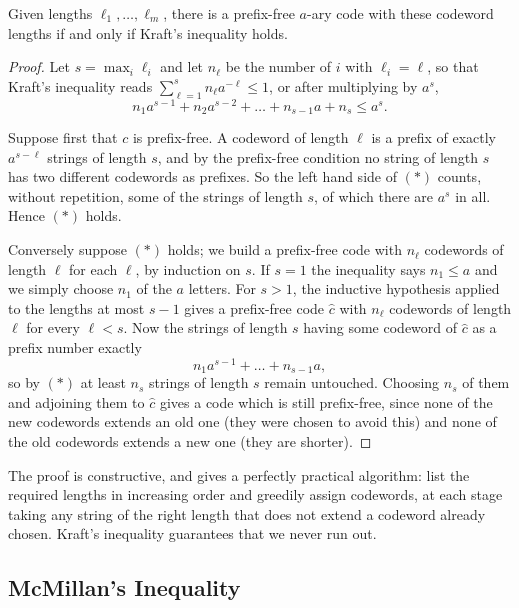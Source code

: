 \begin{theorem}[Kraft]
	Given lengths $\ell_1, \dots, \ell_m$, there is a prefix-free $a$-ary code with these codeword lengths if and only if Kraft's inequality holds.
\end{theorem}

\begin{proof}
	Let $s = \max_i \ell_i$ and let $n_\ell$ be the number of $i$ with $\ell_i = \ell$, so that Kraft's inequality reads $\sum_{\ell=1}^s n_\ell a^{-\ell} \le 1$, or after multiplying by $a^s$,
	\begin{equation*} n_1 a^{s-1} + n_2 a^{s-2} + \dots + n_{s-1}a + n_s \le a^s. \tag{$\ast$}\end{equation*}

	Suppose first that $c$ is prefix-free. A codeword of length $\ell$ is a prefix of exactly $a^{s-\ell}$ strings of length $s$, and by the prefix-free condition no string of length $s$ has two different codewords as prefixes. So the left hand side of $(\ast)$ counts, without repetition, some of the strings of length $s$, of which there are $a^s$ in all. Hence $(\ast)$ holds.

	Conversely suppose $(\ast)$ holds; we build a prefix-free code with $n_\ell$ codewords of length $\ell$ for each $\ell$, by induction on $s$. If $s = 1$ the inequality says $n_1 \le a$ and we simply choose $n_1$ of the $a$ letters. For $s > 1$, the inductive hypothesis applied to the lengths at most $s-1$ gives a prefix-free code $\hat c$ with $n_\ell$ codewords of length $\ell$ for every $\ell < s$. Now the strings of length $s$ having some codeword of $\hat c$ as a prefix number exactly
	$$n_1 a^{s-1} + \dots + n_{s-1}a,$$
	so by $(\ast)$ at least $n_s$ strings of length $s$ remain untouched. Choosing $n_s$ of them and adjoining them to $\hat c$ gives a code which is still prefix-free, since none of the new codewords extends an old one (they were chosen to avoid this) and none of the old codewords extends a new one (they are shorter).
\end{proof}

\begin{remark}
	The proof is constructive, and gives a perfectly practical algorithm: list the required lengths in increasing order and greedily assign codewords, at each stage taking any string of the right length that does not extend a codeword already chosen. Kraft's inequality guarantees that we never run out.
\end{remark}

\subsection{McMillan's Inequality}

